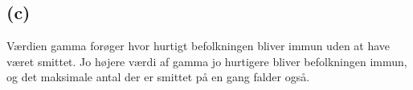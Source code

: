 \subsection*{(c)}
%
Værdien gamma forøger hvor hurtigt befolkningen bliver immun uden at have været smittet. Jo højere værdi af gamma jo hurtigere bliver befolkningen immun, og det maksimale antal der er smittet på en gang falder også.